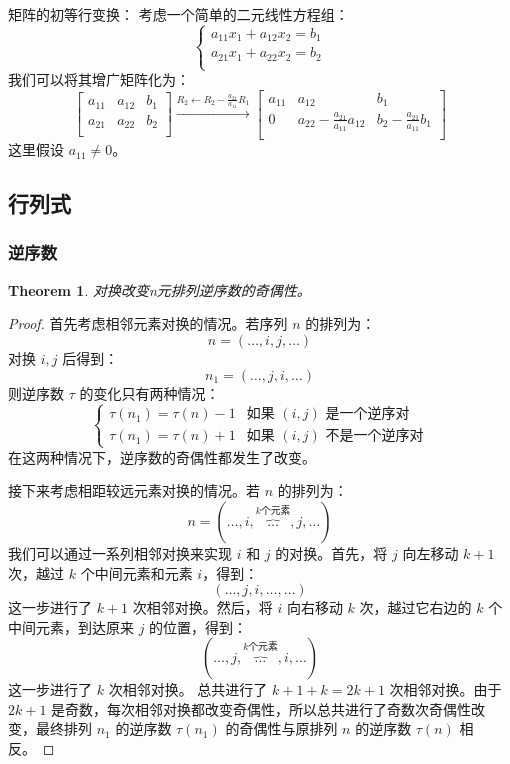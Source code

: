 \documentclass[10pt, a4paper, oneside, UTF8]{ctexbook}
\newtheorem{theorem}{Theorem}[section]
\begin{document}
矩阵的初等行变换：
考虑一个简单的二元线性方程组：
\[
  \begin{cases}
    a_{11}x_1+a_{12}x_2 = b_1 \\
    a_{21}x_1+a_{22}x_2 = b_2 \\
  \end{cases}
\]
我们可以将其增广矩阵化为：
\[
  \begin{bmatrix}
    a_{11} & a_{12} & b_1 \\
    a_{21} & a_{22} & b_2 \\
  \end{bmatrix}
  \xrightarrow{R_2 \leftarrow R_2 - \frac{a_{21}}{a_{11}} R_1}
  \begin{bmatrix}
    a_{11} & a_{12} & b_1 \\
    0 & a_{22} - \frac{a_{21}}{a_{11}} a_{12} & b_2 -
    \frac{a_{21}}{a_{11}} b_1 \\
  \end{bmatrix}
\]
这里假设 $a_{11} \neq 0$。

\subsection*{行列式}

\subsubsection*{逆序数}

\begin{theorem}
  对换改变n元排列逆序数的奇偶性。
\end{theorem}

\begin{proof}
  首先考虑相邻元素对换的情况。若序列 $n$ 的排列为：
  \[
    n = (\dots, i, j, \dots)
  \]
  对换 $i, j$ 后得到：
  \[
    n_{1} = (\dots, j, i, \dots)
  \]
  则逆序数 $\tau$ 的变化只有两种情况：
  \[
    \begin{cases}
      \tau(n_{1}) = \tau(n) - 1 & \text{如果 } (i, j) \text{ 是一个逆序对} \\
      \tau(n_{1}) = \tau(n) + 1 & \text{如果 } (i, j) \text{ 不是一个逆序对}
    \end{cases}
  \]
  在这两种情况下，逆序数的奇偶性都发生了改变。

  接下来考虑相距较远元素对换的情况。若 $n$ 的排列为：
  \[
    n = (\dots, i, \overbrace{\dots}^{k \text{个元素}}, j, \dots)
  \]
  我们可以通过一系列相邻对换来实现 $i$ 和 $j$ 的对换。首先，将 $j$ 向左移动 $k+1$ 次，越过 $k$ 个中间元素和元素 $i$，得到：
  \[
    (\dots, j, i, \dots, \dots)
  \]
  这一步进行了 $k+1$ 次相邻对换。然后，将 $i$ 向右移动 $k$ 次，越过它右边的 $k$ 个中间元素，到达原来 $j$ 的位置，得到：
  \[
    (\dots, j, \overbrace{\dots}^{k \text{个元素}}, i, \dots)
  \]
  这一步进行了 $k$ 次相邻对换。
  总共进行了 $k+1+k = 2k+1$ 次相邻对换。由于 $2k+1$
  是奇数，每次相邻对换都改变奇偶性，所以总共进行了奇数次奇偶性改变，最终排列 $n_1$ 的逆序数 $\tau(n_1)$
  的奇偶性与原排列 $n$ 的逆序数 $\tau(n)$ 相反。
\end{proof}
\end{document}

